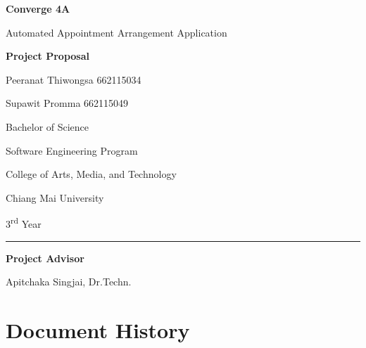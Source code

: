 \documentclass[12pt,a4paper]{article}
\begin{document}
\begin{titlepage}
    \thispagestyle{empty}
    \centering
    \vspace*{3cm}
    {\Huge \textbf{Converge 4A}\par}
    {\Large Automated Appointment Arrangement Application\par}
    \vspace{1.5cm}
    {\Large \textbf{Project Proposal}\par}
    \vfill
    {\large Peeranat Thiwongsa 662115034\par}
    {\large Supawit Promma 662115049\par}
    \vspace{1.5cm}
    {\large Bachelor of Science\par}
    {\large Software Engineering Program\par}
    \vfill
    {\large College of Arts, Media, and Technology\par}
    {\large Chiang Mai University\par}
    {\large 3\textsuperscript{rd} Year\par}
    \vfill
    \rule{0.8\textwidth}{0.5pt}\par
    \vspace{0.8cm}
    {\large \textbf{Project Advisor}\par}
    \vspace{0.3cm}
    {\large Apitchaka Singjai, Dr.Techn.\par}
    \vspace*{1.5cm}
\end{titlepage}

\newpage
\setcounter{page}{2}

\section*{Document History}
\end{document}
